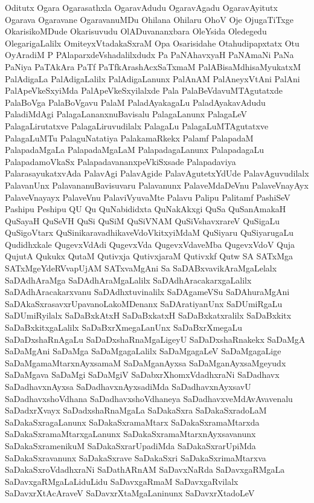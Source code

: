 {Oditutx
Ogara
Ogarasathxla
OgaravAdudu
OgaravAgadu
OgaravAyitutx
Ogarava
Ogaravane
OgaravanuMDu
Ohilana
Ohilaru
OhoV
Oje
OjugaTiTxge
OkarisikoMDude
Okarisuvudu
OlADuvananxbara
OleYsida
Oledegedu
OlegarigaLalilx
OmiteyxVtadakaSxraM
Opa
Osarisidahe
Otahudipapxtatx
Otu
OyAradiM
P
PAlaparxdeVshadalilxdudx
Pa
PaNAhavxyaH
PaNAmaNi
PaNa
PaNiya
PaTAkAra
PaTf
PaTfkArashAcxSaTxmaM
PalABisaMdhisaMyukatxM
PalAdigaLa
PalAdigaLalilx
PalAdigaLanunx
PalAnAM
PalAneyxVtAni
PalAni
PalApeVkeSxyiMda
PalApeVkeSxyilalxde
Pala
PalaBeVdavuMTAgutatxde
PalaBoVga
PalaBoVgavu
PalaM
PaladAyakagaLu
PaladAyakavAdudu
PaladiMdAgi
PalagaLananxnuBavisalu
PalagaLanunx
PalagaLeV
PalagaLirutatxve
PalagaLiruvudilalx
PalagaLu
PalagaLuMTAgutatxve
PalagaLuMTu
PalaguNatatiya
PalakamaRkekx
Palamf
PalapadaM
PalapadaMgaLa
PalapadaMgaLaM
PalapadagaLanunx
PalapadagaLu
PalapadamoVkaSx
PalapadavananxpeVkiSxsade
Palapadaviya
PalarasayukatxvAda
PalavAgi
PalavAgide
PalavAgutetxYdUde
PalavAguvudilalx
PalavanUnx
PalavananuBavisuvaru
Palavanunx
PalaveMdaDeVnu
PalaveVnayAyx
PalaveVnayayx
PalaveVnu
PalaviVyuvaMte
Palavu
Palipu
Palitamf
PashiSeV
Pashipu
Peshipu
QU
Qu
QuNabididxta
QuNakAkxgi
QuSa
QuSanAmakaH
QuSayaH
QuSeVH
QuSi
QuSiM
QuSiVNAM
QuSiVshavxrareV
QuSigaLu
QuSigoVtarx
QuSinikaravadhikaveVdoVkitxyiMdaM
QuSiyaru
QuSiyarugaLu
Qudidhxkale
QugevxVdAdi
QugevxVda
QugevxVdaveMba
QugevxVdoV
Quja
QujutA
Qukukx
QutaM
Qutivxja
QutivxjaraM
Qutivxkf
Qutw
SA
SATxMga
SATxMgeYdeRVvapUjAM
SATxvaMgAni
Sa
SaDABxvavikAraMgaLelalx
SaDAdhAraMga
SaDAdhAraMgaLalilx
SaDAdhAracakarxgaLalilx
SaDAdhAracakarxvanu
SaDAdhxtuvinalilx
SaDAgameVSu
SaDAhuraMgAni
SaDAkaSxrasavxrUpavanoLakoMDenanx
SaDAratiyanUnx
SaDUmiRgaLu
SaDUmiRyilalx
SaDaBxkAtxH
SaDaBxkatxH
SaDaBxkatxralilx
SaDaBxkitx
SaDaBxkitxgaLalilx
SaDaBxrXmegaLanUnx
SaDaBxrXmegaLu
SaDaDxshaRnAgaLu
SaDaDxshaRnaMgaLigeyU
SaDaDxshaRnakekx
SaDaMgA
SaDaMgAni
SaDaMga
SaDaMgagaLalilx
SaDaMgagaLeV
SaDaMgagaLige
SaDaMgamaMtarxnAyxsamaM
SaDaMganAyxsa
SaDaMganAyxsaMgeyudx
SaDaMgava
SaDaMgi
SaDaMgiV
SaDabxrXhomxVdadhxraNi
SaDadhavx
SaDadhavxnAyxsa
SaDadhavxnAyxsadiMda
SaDadhavxnAyxsavU
SaDadhavxshoVdhana
SaDadhavxshoVdhaneya
SaDadhavxveMdAvAvavenalu
SaDadxrXvayx
SaDadxshaRnaMgaLa
SaDakaSxra
SaDakaSxradoLaM
SaDakaSxragaLanunx
SaDakaSxramaMtarx
SaDakaSxramaMtarxda
SaDakaSxramaMtarxgaLanunx
SaDakaSxramaMtarxnAyxsavanunx
SaDakaSxramenikuM
SaDakaSxrarUpadiMda
SaDakaSxrarUpiMda
SaDakaSxravanunx
SaDakaSxrave
SaDakaSxri
SaDakaSxrimaMtarxva
SaDakaSxroVdadhxraNi
SaDathARnAM
SaDavxNaRda
SaDavxgaRMgaLa
SaDavxgaRMgaLaLiduLidu
SaDavxgaRmaM
SaDavxgaRvilalx
SaDavxrXtAcAraveV
SaDavxrXtaMgaLaninunx
SaDavxrXtadoLeV
}
